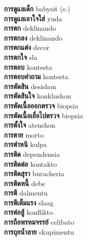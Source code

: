 \textbf{ การดูแลเด็ก  } babysit (s.) \\
\textbf{ การดูแลเอาใจใส่  } yuda \\
\textbf{ การตก  } deklinando \\
\textbf{ การตกลง  } deklinando \\
\textbf{ การตกแต่ง  } decor \\
\textbf{ การตกใจ  } sla \\
\textbf{ การตอบ  } kontesta \\
\textbf{ การตอบคำถาม  } kontesta \\
\textbf{ การตัดสิน  } desishon \\
\textbf{ การตัดสินใจ  } konklushon \\
\textbf{ การตัดเนื้อออกตรวจ  } biopsia \\
\textbf{ การตัดเนื้อเยื่อไปตรวจ  } biopsia \\
\textbf{ การตั้งใจ  } atenshon \\
\textbf{ การตาย  } morto \\
\textbf{ การตำหนิ  } kulpa \\
\textbf{ การติด  } dependensia \\
\textbf{ การติดต่อ  } kontakto \\
\textbf{ การติดสุรา  } buracheria \\
\textbf{ การติดหนี้  } debe \\
\textbf{ การตี  } dalmentu \\
\textbf{ การตีเต็มแรง  } slaag \\
\textbf{ การต่อสู้  } konflikto \\
\textbf{ การถือพรหมจรรย์  } celibato \\
\textbf{ การถุยน้ำลาย  } skupimentu \\

